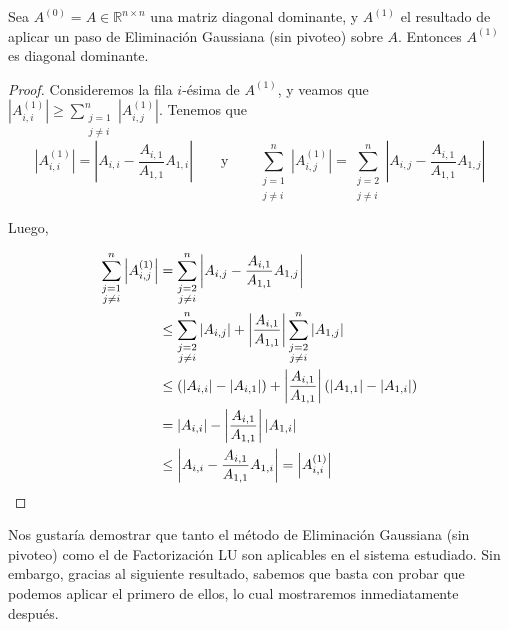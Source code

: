       \begin{lema}
        \label{lema:EG conserva diagonal dominante}
        Sea $A^{(0)} = A \in \mathbb{R}^{n \times n}$ una matriz diagonal dominante, y $A^{(1)}$ el resultado de aplicar un paso de Eliminación Gaussiana (sin pivoteo) sobre $A$. Entonces $A^{(1)}$ es diagonal dominante.
      \end{lema}
      \begin{proof}
        Consideremos la fila $i$-ésima de $A^{(1)}$, y veamos que $\left \vert A^{(1)}_{i,i} \right \vert \geq \sum_{\substack{j = 1 \\ j \neq i}}^n \left \vert A^{(1)}_{i,j} \right \vert$. Tenemos que
        \[ \left \vert A^{(1)}_{i,i} \right \vert = \left \vert A_{i,i} - \frac{A_{i,1}}{A_{1,1}} A_{1,i} \right \vert
          \qquad \text{y} \qquad
        \sum_{\substack{j = 1 \\ j \neq i}}^n \left \vert A^{(1)}_{i,j} \right \vert
          = \sum_{\substack{j = 2 \\ j \neq i}}^n \left \vert A_{i,j} - \frac{A_{i,1}}{A_{1,1}} A_{1,j} \right \vert \]

        Luego,

        \[ \begin{split}
          \sum_{\substack{j = 1 \\ j \neq i}}^n \left \vert A^{(1)}_{i,j} \right \vert
          &= \sum_{\substack{j = 2 \\ j \neq i}}^n \left \vert A_{i,j} - \frac{A_{i,1}}{A_{1,1}} A_{1,j} \right \vert \\
          &\leq \sum_{\substack{j = 2 \\ j \neq i}}^n \vert A_{i,j} \vert + \left \vert \frac{A_{i,1}}{A_{1,1}} \right \vert \sum_{\substack{j = 2 \\ j \neq i}}^n \vert A_{1,j} \vert \\
          &\leq \left( \vert A_{i,i} \vert - \vert A_{i,1} \vert \right) + \left \vert \frac{A_{i,1}}{A_{1,1}} \right \vert \left( \vert A_{1,1} \vert - \vert A_{1,i} \vert \right) \\
          &= \vert A_{i,i} \vert - \left \vert \frac{A_{i,1}}{A_{1,1}} \right \vert \vert A_{1,i} \vert \\
          &\leq \left \vert A_{i,i} -  \frac{A_{i,1}}{A_{1,1}} A_{1,i} \right \vert = \left \vert A^{(1)}_{i,i} \right \vert \qedhere
        \end{split} \]
      \end{proof}

      Nos gustaría demostrar que tanto el método de Eliminación Gaussiana (sin pivoteo) como el de Factorización LU son aplicables en el sistema estudiado. Sin embargo, gracias al siguiente resultado, sabemos que basta con probar que podemos aplicar el primero de ellos, lo cual mostraremos inmediatamente después.

